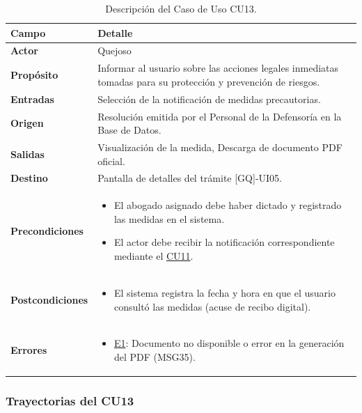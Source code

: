 \begin{appendices}
\begin{table}[htbp]
\centering
\small
\begin{tabular}{|p{3.5cm}|p{10.5cm}|}
\hline
\rowcolor[HTML]{EFEFEF} 
\textbf{Campo} & \textbf{Detalle} \\ \hline
\textbf{Actor} & Quejoso \\ \hline
\textbf{Propósito} & Informar al usuario sobre las acciones legales inmediatas tomadas para su protección y prevención de riesgos. \\ \hline
\textbf{Entradas} & Selección de la notificación de medidas precautorias. \\ \hline
\textbf{Origen} & Resolución emitida por el Personal de la Defensoría en la Base de Datos. \\ \hline
\textbf{Salidas} & Visualización de la medida, Descarga de documento PDF oficial. \\ \hline
\textbf{Destino} & Pantalla de detalles del trámite [GQ]-UI05. \\ \hline
\textbf{Precondiciones} & 
\begin{itemize}[nosep, leftmargin=*]
    \item El abogado asignado debe haber dictado y registrado las medidas en el sistema.
    \item El actor debe recibir la notificación correspondiente mediante el \hyperlink{anexo:casos_uso}{CU11}.
\end{itemize} \\ \hline
\textbf{Postcondiciones} & 
\begin{itemize}[nosep, leftmargin=*]
    \item El sistema registra la fecha y hora en que el usuario consultó las medidas (acuse de recibo digital).
\end{itemize} \\ \hline
\textbf{Errores} & 
\begin{itemize}[nosep, leftmargin=*]
    \item \hyperlink{err:E18}{E1}: Documento no disponible o error en la generación del PDF (MSG35).
\end{itemize} \\ \hline
\end{tabular}
\caption{Descripción del Caso de Uso CU13.}
\label{tab:cu13_especificacion}
\end{table}

\subsubsection{Trayectorias del CU13}


\end{appendices}
